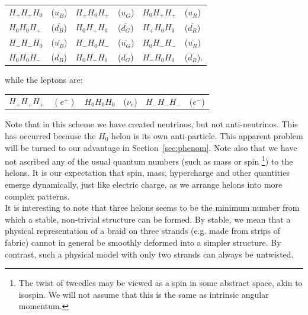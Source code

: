 \documentclass[twocolumn,showpacs,preprintnumbers,amsmath,amssymb]{revtex4}
\newcommand{\anti}[1]{\overline{#1}}
\begin{document}
\begin{center}
\begin{tabular}{llllll}
  $H_+H_+H_0$ & \hspace{-0.4mm}($u_B$)\hspace{1.2mm} 
     & $H_+H_0H_+$ & \hspace{-0.4mm}($u_G$) \hspace{1.2mm} & $H_0H_+H_+$ & \hspace{-0.4mm}($u_R$)\\
  $H_0H_0H_+$ & ($\anti{d_B}$) 
     & $H_0H_+H_0$ & ($\anti{d_G}$)
                       & $H_+H_0H_0$ & ($\anti{d_R}$)\\ 
  $H_-H_-H_0$ & ($\anti{u_B}$)
     & $H_-H_0H_-$ & ($\anti{u_G}$)
                       & $H_0H_-H_-$ & ($\anti{u_R}$)\\  
  $H_0H_0H_-$ & ($d_B$)  
     & $H_0H_-H_0$ & ($d_G$) & $H_-H_0H_0$ & ($d_R$).\\  
\end{tabular}
\end{center}%
while the leptons are:
\begin{center}
\begin{tabular}{llllll}
$H_+H_+H_+$ & \hspace{-0.4mm}$(e^+)$ \hspace{1.2mm} 
   & $H_0H_0H_0$ & ($\nu_e$) \hspace{1.2mm}
     & $H_-H_-H_-$ & ($e^-$) \\
\end{tabular}
\end{center}%
Note that in this scheme we have created neutrinos, but not anti-neutrinos.
This has occurred because the $H_0$ helon is its own anti-particle. This 
apparent problem will be turned to our advantage in Section~\ref{sec:phenom}. 
Note also that we have not ascribed any of the usual quantum numbers (such as mass or 
spin \footnote{The twist of tweedles may be viewed as a spin in some abstract space,
akin to isospin. We will not assume that this is the same as 
intrinsic angular momentum.}) to the helons. It is our expectation that spin, mass,
hypercharge and other quantities emerge dynamically, just like electric charge, as 
we arrange helons into more complex patterns.\\
It is interesting to note that three helons seems to be the minimum number 
from which a stable, non-trivial structure can be formed. By stable, we mean that 
a physical representation of a braid on three strands (e.g. made from strips of 
fabric) cannot in general be smoothly deformed into a simpler structure. By 
contrast, such a physical model with only two strands can always be untwisted.
\end{document}

